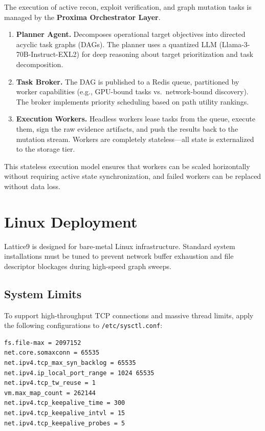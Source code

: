 \documentclass[11pt,a4paper]{article}
\theoremstyle{definition}
\numberwithin{equation}{section}
\begin{document}
The execution of active recon, exploit verification, and graph mutation tasks is managed by the \textbf{Proxima Orchestrator Layer}.

\begin{enumerate}[leftmargin=2em]
    \item \textbf{Planner Agent.} Decomposes operational target objectives into directed acyclic task graphs (DAGs). The planner uses a quantized LLM (Llama-3-70B-Instruct-EXL2) for deep reasoning about target prioritization and task decomposition.

    \item \textbf{Task Broker.} The DAG is published to a Redis queue, partitioned by worker capabilities (e.g., GPU-bound tasks vs.\ network-bound discovery). The broker implements priority scheduling based on path utility rankings.

    \item \textbf{Execution Workers.} Headless workers lease tasks from the queue, execute them, sign the raw evidence artifacts, and push the results back to the mutation stream. Workers are completely stateless---all state is externalized to the storage tier.
\end{enumerate}

This stateless execution model ensures that workers can be scaled horizontally without requiring active state synchronization, and failed workers can be replaced without data loss.

\section{Linux Deployment}\label{sec:deployment}

Lattice9 is designed for bare-metal Linux infrastructure. Standard system installations must be tuned to prevent network buffer exhaustion and file descriptor blockages during high-speed graph sweeps.

\subsection{System Limits}\label{subsec:sysctl}

To support high-throughput TCP connections and massive thread limits, apply the following configurations to \texttt{/etc/sysctl.conf}:

\begin{lstlisting}[style=latticecode,title={\textsf{/etc/sysctl.d/99-lattice9.conf}}]
fs.file-max = 2097152
net.core.somaxconn = 65535
net.ipv4.tcp_max_syn_backlog = 65535
net.ipv4.ip_local_port_range = 1024 65535
net.ipv4.tcp_tw_reuse = 1
vm.max_map_count = 262144
net.ipv4.tcp_keepalive_time = 300
net.ipv4.tcp_keepalive_intvl = 15
net.ipv4.tcp_keepalive_probes = 5
\end{lstlisting}
\end{document}
